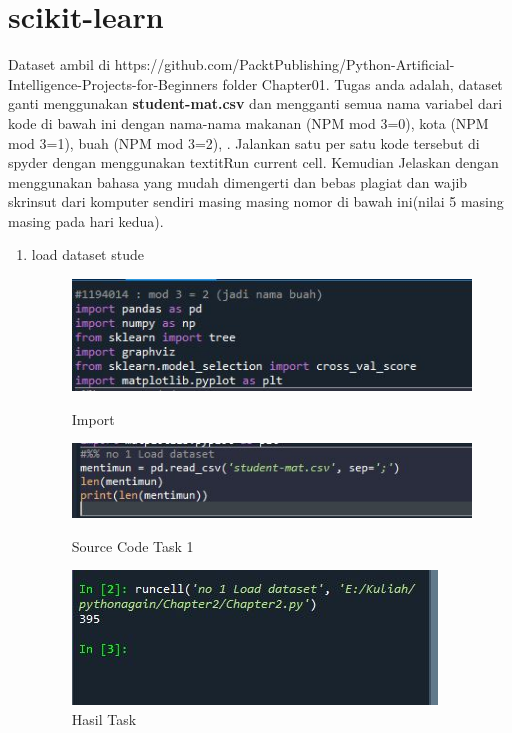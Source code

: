 \section{scikit-learn}
Dataset ambil di https://github.com/PacktPublishing/Python-Artificial-Intelligence-Projects-for-Beginners folder Chapter01.
Tugas anda adalah, dataset ganti menggunakan \textbf{student-mat.csv} dan mengganti semua nama variabel dari kode di bawah ini dengan nama-nama makanan (NPM mod 3=0), kota (NPM mod 3=1), buah (NPM mod 3=2), . Jalankan satu per satu kode tersebut di spyder dengan menggunakan textit{Run current cell}. Kemudian Jelaskan dengan menggunakan bahasa yang mudah dimengerti dan bebas plagiat dan wajib skrinsut dari komputer sendiri masing masing nomor di bawah ini(nilai 5 masing masing pada hari kedua).

\begin{enumerate}

\item load dataset stude
\begin{figure}[!htbp]
    \centering
    \includegraphics[scale=0.5]{figures/importchap2.JPG}
	\caption{Import}
    \includegraphics[scale=0.5]{figures/Chap2-1.JPG}
	\caption{Source Code Task 1}
    \includegraphics[scale=0.5]{figures/Chap2-1.1.JPG}
	\caption{Hasil Task}
\end{figure}


\end{enumerate}
